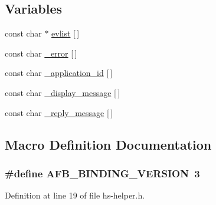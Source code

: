 \subsection*{Variables}
\begin{DoxyCompactItemize}
\item 
const char $\ast$ \hyperlink{hs-helper_8h_a0cd84b1a2184c9b84d1b7bf24582f28e}{evlist} \mbox{[}$\,$\mbox{]}
\item 
const char \hyperlink{hs-helper_8h_aed1c5296a2e6d34945507a0fca17a376}{\+\_\+error} \mbox{[}$\,$\mbox{]}
\item 
const char \hyperlink{hs-helper_8h_a6a0e1db2562b442f8131ddf64b61d1ba}{\+\_\+application\+\_\+id} \mbox{[}$\,$\mbox{]}
\item 
const char \hyperlink{hs-helper_8h_abfd6c1d6f316fa952b11553f8f275e92}{\+\_\+display\+\_\+message} \mbox{[}$\,$\mbox{]}
\item 
const char \hyperlink{hs-helper_8h_a79b0f0b481161527ccb80e83da143219}{\+\_\+reply\+\_\+message} \mbox{[}$\,$\mbox{]}
\end{DoxyCompactItemize}


\subsection{Macro Definition Documentation}
\subsubsection[{\texorpdfstring{A\+F\+B\+\_\+\+B\+I\+N\+D\+I\+N\+G\+\_\+\+V\+E\+R\+S\+I\+ON}{AFB_BINDING_VERSION}}]{\setlength{\rightskip}{0pt plus 5cm}\#define A\+F\+B\+\_\+\+B\+I\+N\+D\+I\+N\+G\+\_\+\+V\+E\+R\+S\+I\+ON~3}\hypertarget{hs-helper_8h_ad2c1fbc92ba364fcf83f15e6d0af66f0}{}\label{hs-helper_8h_ad2c1fbc92ba364fcf83f15e6d0af66f0}


Definition at line 19 of file hs-\/helper.\+h.

